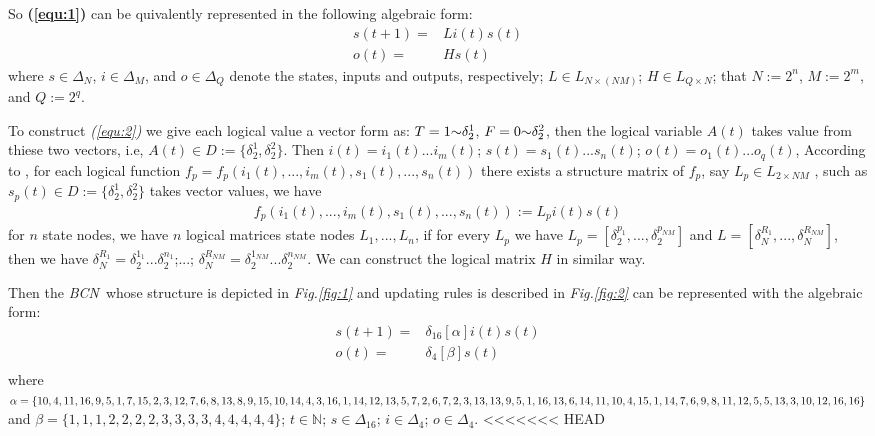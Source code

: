 \documentclass[conference]{IEEEtran} %
\def \BCN {{\em BCN}}
\begin{document}
So {\bf (\ref{equ:1})} can be quivalently represented in the following algebraic form:
\begin{equation}
\begin{split}
s(t+1)=&Li(t)s(t)\\
o(t)=&Hs(t)
\end{split}
\label{equ:2}
\end{equation}
where $s\in\Delta_N$, $i\in\Delta_M$, and  $o\in\Delta_Q$ denote the states, inputs and outputs, respectively; $L\in L_{N\times\left(NM\right)}$; $H\in L_{Q\times N}$; that $N:=2^n$, $M:=2^m$, and $Q:=2^q$. 

To construct {\em (\ref{equ:2})} we give each logical value a vector form as: $T = 1 \scriptsize{\sim} \delta_2^1$, $F = 0 \scriptsize{\sim} \delta_2^2$, then the logical variable $A(t)$ takes value from thiese two vectors, i.e, $A(t)\in D:=\{\delta_2^1, \delta_2^2\}$. Then $i(t)=i_1(t)...i_m(t)$; $s(t)=s_1(t)...s_n(t)$; $o(t)=o_1(t)...o_q(t)$, According to \cite{Cheng2003Semi}, for each logical function $f_p=f_p(i_1(t),...,i_m(t),s_1(t),...,s_n(t))$ there exists a structure matrix of $f_p$, say $L_p\in L_{2\times {NM}}$ , such as $s_p(t)\in D:=\{\delta_2^1, \delta_2^2\}$  takes vector values, we have 
\begin{equation}
\begin{split}
f_p(i_1(t),...,i_m(t),s_1(t),...,s_n(t)):=L_pi(t)s(t)
\end{split}
\end{equation}
for $n$ state nodes, we have $n$ logical matrices state nodes $L_1,...,L_n$, if for every $L_p$ we have $L_p=[\delta_2^{p_1},...,\delta_2^{p_{NM}}]$ and $L=[\delta_N^{R_1},...,\delta_N^{R_{NM}}]$, then we have $\delta_N^{R_1}=\delta_2^{1_1}...\delta_2^{n_1}$;...; $\delta_N^{R_{NM}}=\delta_2^{1_{NM}}...\delta_2^{n_{NM}}$. We can construct the logical matrix $H$ in similar way.

Then the \BCN\ whose structure is depicted in {\em Fig.\ref{fig:1}} and updating rules is described in {\em Fig.\ref{fig:2}} can be represented with the algebraic form:
\begin{equation}
\begin{split}
s(t+1) =&\delta_{16}[\alpha]i(t)s(t)\\
o(t) =&\delta_4[\beta]s(t)\\
\end{split}
\end{equation}
where $\alpha=\{10,4,11,16,9,5,1, 7,15,2,3,12,7,6,8,13,8,9,\\15,10,14,4,3,16,1,14,12,13,5,7,2,6,7,2,3,13,13,9,5,1,\\16,13 ,6,14,11,10,4,15,1,14 ,7,6,9 ,8,11,12,5,5,13,3,10,\\12,16,16\}$ and $\beta=\{1,1,1,2,2,2,2,3,3,3,3,4,4,4,4,4\}$; $t\in \mathbb{N}$; $s\in \Delta_{16}$; $i\in \Delta_4$; $o\in \Delta_4$.
<<<<<<< HEAD
\end{document}
